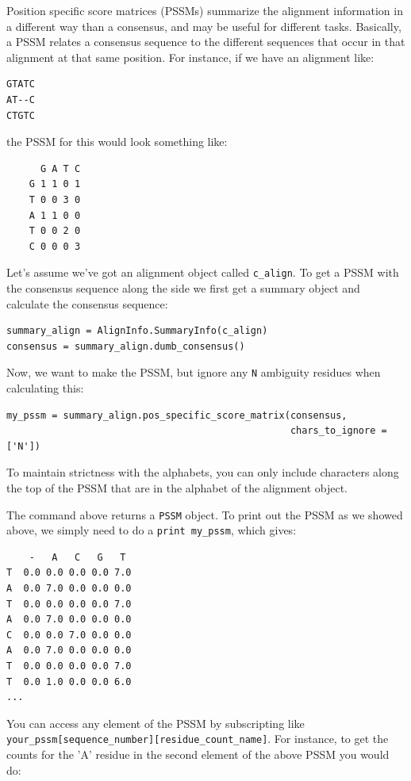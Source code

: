 \documentclass{article}
\begin{document}
Position specific score matrices (PSSMs) summarize the alignment information in a different way than a consensus, and may be useful for different tasks. Basically, a PSSM relates a consensus sequence to the different sequences that occur in that alignment at that same position. For instance, if we have an alignment like:

\begin{verbatim}
GTATC
AT--C
CTGTC
\end{verbatim}

the PSSM for this would look something like:

\begin{verbatim}
      G A T C
    G 1 1 0 1
    T 0 0 3 0
    A 1 1 0 0
    T 0 0 2 0
    C 0 0 0 3
\end{verbatim}

Let's assume we've got an alignment object called \verb|c_align|. To get a PSSM with the consensus sequence along the side we first get a summary object and calculate the consensus sequence:

\begin{verbatim}
summary_align = AlignInfo.SummaryInfo(c_align)
consensus = summary_align.dumb_consensus()
\end{verbatim}

Now, we want to make the PSSM, but ignore any \verb|N| ambiguity residues when calculating this:

\begin{verbatim}
my_pssm = summary_align.pos_specific_score_matrix(consensus,
                                                  chars_to_ignore = ['N'])
\end{verbatim}

To maintain strictness with the alphabets, you can only include characters along the top of the PSSM that are in the alphabet of the alignment object.

The command above returns a \verb|PSSM| object. To print out the PSSM as we showed above, we simply need to do a \verb|print my_pssm|, which gives:

\begin{verbatim}
    -   A   C   G   T
T  0.0 0.0 0.0 0.0 7.0
A  0.0 7.0 0.0 0.0 0.0
T  0.0 0.0 0.0 0.0 7.0
A  0.0 7.0 0.0 0.0 0.0
C  0.0 0.0 7.0 0.0 0.0
A  0.0 7.0 0.0 0.0 0.0
T  0.0 0.0 0.0 0.0 7.0
T  0.0 1.0 0.0 0.0 6.0
...
\end{verbatim}

You can access any element of the PSSM by subscripting like \verb|your_pssm[sequence_number][residue_count_name]|. For instance, to get the counts for the 'A' residue in the second element of the above PSSM you would do:
\end{document}
